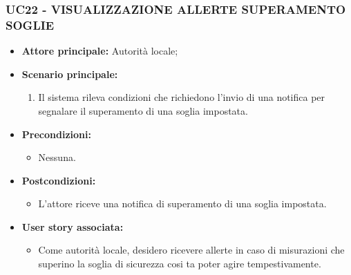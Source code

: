 \subsubsection{UC22 - VISUALIZZAZIONE ALLERTE SUPERAMENTO SOGLIE}
\begin{itemize}
    \item \textbf{Attore principale:} Autorità locale;
    \item \textbf{Scenario principale:}
          \begin{enumerate}
              \item  Il sistema rileva condizioni che richiedono l'invio di una notifica per segnalare il superamento di una soglia impostata.
          \end{enumerate}
    \item \textbf{Precondizioni:}
          \begin{itemize}
              \item  Nessuna.
          \end{itemize}
    \item \textbf{Postcondizioni:}
          \begin{itemize}
              \item  L'attore riceve una notifica di superamento di una soglia impostata.
          \end{itemize}
    \item \textbf{User story associata:}
          \begin{itemize}
              \item Come autorità locale,
                    desidero ricevere allerte in caso di misurazioni che superino la soglia di sicurezza cosi ta poter agire tempestivamente.
          \end{itemize}
\end{itemize}